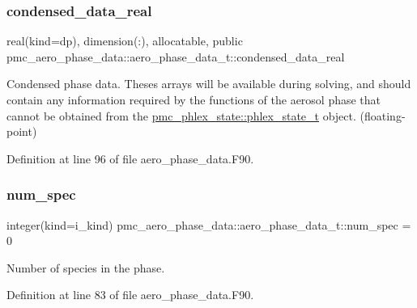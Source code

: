 \subsubsection{\texorpdfstring{condensed\+\_\+data\+\_\+real}{condensed\_data\_real}}
{\footnotesize\ttfamily real(kind=dp), dimension(\+:), allocatable, public pmc\+\_\+aero\+\_\+phase\+\_\+data\+::aero\+\_\+phase\+\_\+data\+\_\+t\+::condensed\+\_\+data\+\_\+real}



Condensed phase data. Theses arrays will be available during solving, and should contain any information required by the functions of the aerosol phase that cannot be obtained from the {\ttfamily \mbox{\hyperlink{structpmc__phlex__state_1_1phlex__state__t}{pmc\+\_\+phlex\+\_\+state\+::phlex\+\_\+state\+\_\+t}}} object. (floating-\/point) 



Definition at line 96 of file aero\+\_\+phase\+\_\+data.\+F90.

\mbox{\label{structpmc__aero__phase__data_1_1aero__phase__data__t_a5d60d405506f43cedb9802a5a082deb5}} 
\subsubsection{\texorpdfstring{num\+\_\+spec}{num\_spec}}
{\footnotesize\ttfamily integer(kind=i\+\_\+kind) pmc\+\_\+aero\+\_\+phase\+\_\+data\+::aero\+\_\+phase\+\_\+data\+\_\+t\+::num\+\_\+spec = 0\hspace{0.3cm}{\ttfamily [private]}}



Number of species in the phase. 



Definition at line 83 of file aero\+\_\+phase\+\_\+data.\+F90.

\mbox{\label{structpmc__aero__phase__data_1_1aero__phase__data__t_a6b432657e1385cc12e69d30d8aee02aa}} 
